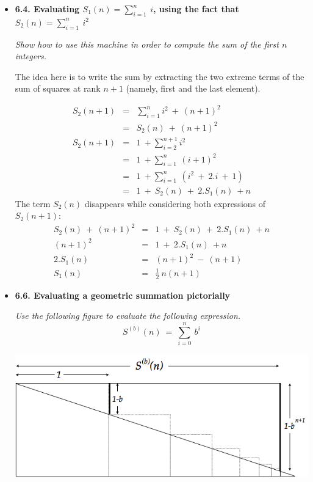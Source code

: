 \begin{itemize}
\item
{\bf 6.4. Evaluating $S_1(n) = \sum_{i=1}^n \ i$, using the fact that $S_2(n) = \sum_{i=1}^n \ i^2$}
\smallskip

{\em Show how to use this machine in order to compute the sum of the first $n$ integers.}

\medskip
The idea here is to write the sum by extracting the two extreme terms of the sum of squares at rank $n+1$ (namely, first and the last element).

\begin{eqnarray*}
S_2(n+1) & = &  \sum_{i=1}^{n} i^2 \ + \ (n+1)^2  \\
 & = & S_2(n) \ + \ (n+1)^2 \\
S_2(n+1) & = &  1 \ + \sum_{i=2}^{n+1} i^2 \\
 & = &  1 \ + \sum_{i=1}^{n} \ (i+1)^2 \\
 & = &  1 \ + \sum_{i=1}^{n} \ (i^2 \ + \ 2.i \ + \ 1) \\
 & = & 1 \ + \ S_2(n) \ + \ 2.S_1(n) \ + n
\end{eqnarray*} 
The term $S_2(n)$ disappears while considering both expressions of $S_2(n+1)$:
\begin{eqnarray*}
 S_2(n) \ + \ (n+1)^2 & = & 1 \ + \ S_2(n) \ + \ 2.S_1(n) \ + n \\
 (n+1)^2 & = & 1 \ + \ 2.S_1(n) \ + n \\
 2.S_1(n) & = & (n+1)^2 \ - \ (n + 1) \\
 S_1(n) & =  & \frac{1}{2} \ n(n+1) 
\end{eqnarray*} 
\medskip

\item
{\bf 6.6. Evaluating a geometric summation pictorially}
\smallskip


{\em Use the following figure to evaluate the following expression.}
\[ S^{(b)}(n) \ = \ \sum_{i=0}^n \ b^i \]

\centerline{\includegraphics[scale=0.4]{FiguresArithmetic/ThalesGeometricSumFiniteSol}}
\smallskip


\end{itemize}
